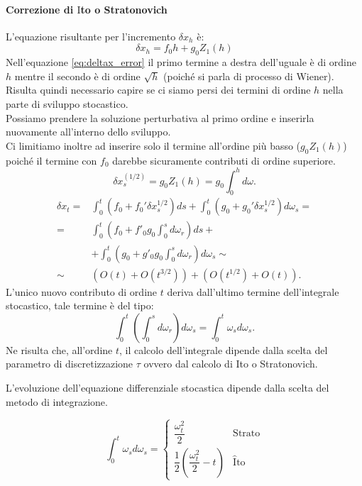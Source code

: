 \paragraph{Correzione di $\hat{\text{I}}$to o Stratonovich}%
\label{par:Correzione di ito o Stratonovich}
L'equazione risultante per l'incremento $\delta x_h$ è:
\begin{equation}
\delta x_h = f_0 h + g_0Z_1(h) 
\label{eq:deltax_error}
\end{equation}
Nell'equazione \ref{eq:deltax_error} il primo termine a destra dell'uguale è di ordine $h$ mentre il secondo è di ordine $\sqrt{h}$ (poiché si parla di processo di Wiener). \\
Risulta quindi necessario capire se ci siamo persi dei termini di ordine $h$  nella parte di sviluppo stocastico.\\
Possiamo prendere la soluzione perturbativa al primo ordine e inserirla nuovamente all'interno dello sviluppo.\\
Ci limitiamo inoltre ad inserire solo il termine all'ordine più basso ($g_0Z_1(h)$) poiché il termine con $f_0$  darebbe sicuramente contributi di ordine superiore.
\[
    \delta x_s^{(1 /2)} = g_0Z_1(h) = g_0  \int_{0}^{h} d\omega 
.\] 
\[\begin{aligned}
    \delta x_t =& \int_0^t \left(f_0 + f_0' \delta x_s^{1 / 2}\right)ds + \int_0^t \left(g_0 + g_0' \delta x_s^{1 / 2}\right)d\omega_s = \\
    =& \int_{0}^{t} \left(f_0 + f'_0 g_0\int_{0}^{s}d\omega_r  \right) ds + \\
		 & + \int_{0}^{t} \left(g_0+ g'_0 g_0 \int_{0}^{s} d\omega_r\right)d\omega_s  \sim \\
    \sim & \left(O(t) + O(t^{3 / 2}) \right) + \left(O(t^{1 / 2}) + O(t)\right)
.\end{aligned}\]
L'unico nuovo contributo di ordine $t$ deriva dall'ultimo termine dell'integrale stocastico, tale termine è del tipo:
\[
    \int_{0}^{t} \left(\int_{0}^{s} d\omega_r\right) d\omega_s = \int_{0}^{t} \omega_sd\omega_s 
.\] 
Ne risulta che, all'ordine $t$, il calcolo dell'integrale dipende dalla scelta del parametro di discretizzazione $\tau$ ovvero dal calcolo di $\hat{\text{I}}$to o Stratonovich. 
\begin{bluebox}{}
    L'evoluzione dell'equazione differenziale stocastica dipende dalla scelta del metodo di integrazione.
\end{bluebox}
\[
  \int_{0}^{t} \omega_sd\omega_s =
  \begin{cases}
      \dfrac{\omega_t^2}{2} & \text{Strato}\\
      \dfrac{1}{2}\left(\dfrac{\omega_t^2}{2} - t\right) & \hat{\text{I}}\text{to}
  \end{cases}
\] 
